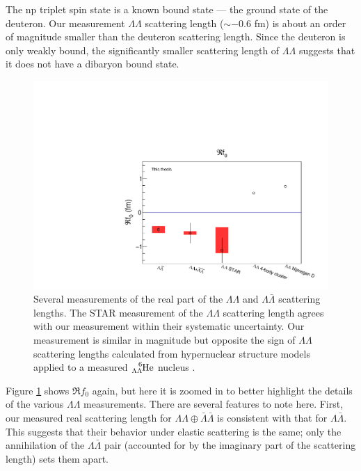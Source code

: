 The np triplet spin state is a known bound state --- the ground state of the deuteron.
Our measurement $\Lambda\Lambda$ scattering length ($\sim-0.6$ fm) is about an order of magnitude smaller than the deuteron scattering length.
Since the deuteron is only weakly bound, the significantly smaller scattering length of $\Lambda\Lambda$ suggests that it does not have a dibaryon bound state.

\begin{figure}[hbt]
\includegraphics[width=36pc]{Figures/FitResults/2016-10-12-Ref0Zoom.pdf}
\caption[Measurements of $\Re f_0$ for various particle pairs (zoomed)]{Several measurements of the real part of the $\Lambda\Lambda$ and $\Lambda\bar{\Lambda}$ scattering lengths. The STAR measurement \cite{Adamczyk:2014vca} of the $\Lambda\Lambda$ scattering length agrees with our measurement within their systematic uncertainty. Our measurement is similar in magnitude but opposite the sign of $\Lambda\Lambda$ scattering lengths calculated from hypernuclear structure models \cite{ Hiyama:2002yj, Filikhin:2002wm} applied to a measured $\ce{^{6}_{\Lambda\Lambda}\mathrm{He}}$ nucleus \cite{Takahashi:2001nm}.}
\label{fig:Ref0Zoom}
\end{figure}

Figure \ref{fig:Ref0Zoom} shows $\Re f_0$ again, but here it is zoomed in to better highlight the details of the various $\Lambda\Lambda$ measurements.
There are several features to note here.
First, our measured real scattering length for $\Lambda\Lambda\oplus\bar{\Lambda}\bar{\Lambda}$ is consistent with that for $\Lambda\bar{\Lambda}$.
This suggests that their behavior under elastic scattering is the same; only the annihilation of the $\Lambda\bar{\Lambda}$ pair (accounted for by the imaginary part of the scattering length) sets them apart.


